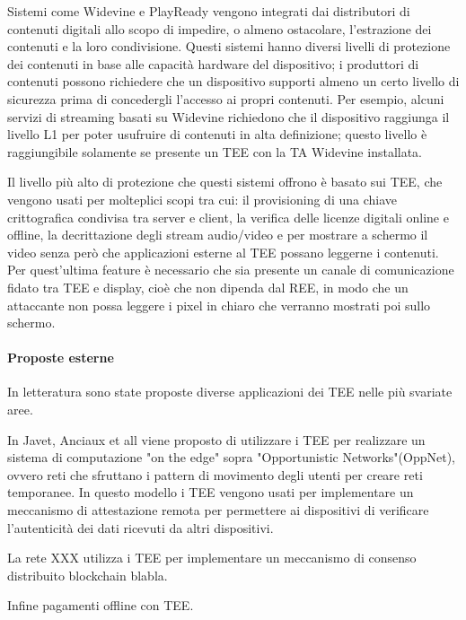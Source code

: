 \documentclass[12pt,italian]{report}
\begin{document}
Sistemi come Widevine\cite{widevine} e PlayReady\cite{playready} vengono
integrati dai distributori di contenuti digitali allo scopo di impedire, o
almeno ostacolare, l'estrazione dei contenuti e la loro condivisione.
Questi sistemi hanno diversi livelli di protezione dei contenuti in base alle
capacità hardware del dispositivo; i produttori di contenuti possono richiedere
che un dispositivo supporti almeno un certo livello di sicurezza prima di
concedergli l'accesso ai propri contenuti.
Per esempio, alcuni servizi di streaming basati su Widevine richiedono che il
dispositivo raggiunga il livello L1 per poter usufruire di contenuti in alta
definizione; questo livello è raggiungibile solamente se presente un TEE con
la TA Widevine installata.

Il livello più alto di protezione che questi sistemi offrono è basato sui TEE,
che vengono usati per molteplici scopi tra cui: il provisioning di una chiave
crittografica condivisa tra server e client, la verifica delle licenze digitali
online e offline, la decrittazione degli stream audio/video e per mostrare
a schermo il video senza però che applicazioni esterne al TEE possano leggerne
i contenuti.
Per quest'ultima feature è necessario che sia presente un canale di
comunicazione fidato tra TEE e display, cioè che non dipenda dal REE, in modo
che un attaccante non possa leggere i pixel in chiaro che verranno mostrati poi
sullo schermo. 

\paragraph{Proposte esterne}

In letteratura sono state proposte diverse applicazioni dei TEE nelle più svariate aree.

In Javet, Anciaux et all\cite{edgeletcomputing} viene proposto di utilizzare i
TEE per realizzare un sistema di computazione "on the edge" sopra
"Opportunistic Networks"(OppNet), ovvero reti che sfruttano i
pattern di movimento degli utenti per creare reti temporanee.
In questo modello i TEE vengono usati per implementare un meccanismo di
attestazione remota per permettere ai dispositivi di verificare l'autenticità
dei dati ricevuti da altri dispositivi.

La rete XXX\cite{???} utilizza i TEE per implementare un meccanismo di consenso distribuito
blockchain blabla.

Infine \cite{??} pagamenti offline con TEE.
\end{document}
